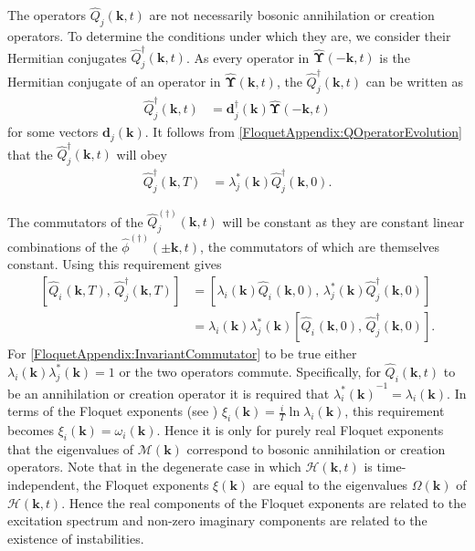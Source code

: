 The operators $\hat{Q}_j(\bm{k}, t)$ are not necessarily bosonic annihilation or creation operators. To determine the conditions under which they are, we consider their Hermitian conjugates $\hat{Q}_j^\dagger(\bm{k}, t)$. As every operator in $\hat{\bm{\Upsilon}}(-\bm{k}, t)$ is the Hermitian conjugate of an operator in $\hat{\bm{\Upsilon}}(\bm{k}, t)$, the $\hat{Q}_j^\dagger(\bm{k}, t)$ can be written as
\begin{align}
    \label{FloquetAppendix:QDaggerDefinition}
    \hat{Q}_j^\dagger(\bm{k}, t) &= \bm{d}_j^\dagger(\bm{k}) \hat{\bm{\Upsilon}}(-\bm{k}, t)
\end{align}
for some vectors $\bm{d}_j(\bm{k})$. It follows from \eqref{FloquetAppendix:QOperatorEvolution} that the $\hat{Q}_j^\dagger(\bm{k}, t)$ will obey
\begin{align}
    \label{FloquetAppendix:QDaggerEvolution}
    \hat{Q}_j^\dagger(\bm{k}, T) &= \lambda_j^*(\bm{k}) \hat{Q}_j^\dagger(\bm{k}, 0).
\end{align}

The commutators of the $\hat{Q}_j^{(\dagger)}(\bm{k}, t)$ will be constant as they are constant linear combinations of the $\hat{\phi}^{(\dagger)}(\pm\bm{k}, t)$, the commutators of which are themselves constant. Using this requirement gives
\begin{align}
    \left[ \hat{Q}_i^{\phantom{\dagger}}(\bm{k}, T),\, \hat{Q}_j^\dagger(\bm{k}, T) \right] &= \left[ \lambda_i(\bm{k}) \hat{Q}_i^{\phantom{\dagger}}(\bm{k}, 0),\, \lambda_j^*(\bm{k}) \hat{Q}_j^\dagger(\bm{k}, 0)\right]\\
        &= \lambda_i(\bm{k}) \lambda_j^*(\bm{k}) \left[ \hat{Q}_i^{\phantom{\dagger}}(\bm{k}, 0),\, \hat{Q}_j^\dagger(\bm{k}, 0)\right].
        \label{FloquetAppendix:InvariantCommutator}
\end{align}
For \eqref{FloquetAppendix:InvariantCommutator} to be true either $\lambda_i(\bm{k}) \lambda_j^*(\bm{k}) = 1$ or the two operators commute. Specifically, for $\hat{Q}_i(\bm{k}, t)$ to be an annihilation or creation operator it is required that ${\lambda_i^*(\bm{k})}^{-1} = \lambda_i(\bm{k})$. In terms of the Floquet exponents (see ) $\displaystyle \xi_i(\bm{k}) = \frac{i}{T} \ln \lambda_i(\bm{k})$, this requirement becomes $\xi_i(\bm{k}) = \omega_i(\bm{k})$. Hence it is only for purely real Floquet exponents that the eigenvalues of $\mathcal{M}(\bm{k})$ correspond to bosonic annihilation or creation operators. Note that in the degenerate case in which $\mathcal{H}(\bm{k}, t)$ is time-independent, the Floquet exponents $\xi(\bm{k})$ are equal to the eigenvalues $\Omega(\bm{k})$ of $\mathcal{H}(\bm{k}, t)$. Hence the real components of the Floquet exponents are related to the excitation spectrum and non-zero imaginary components are related to the existence of instabilities.

